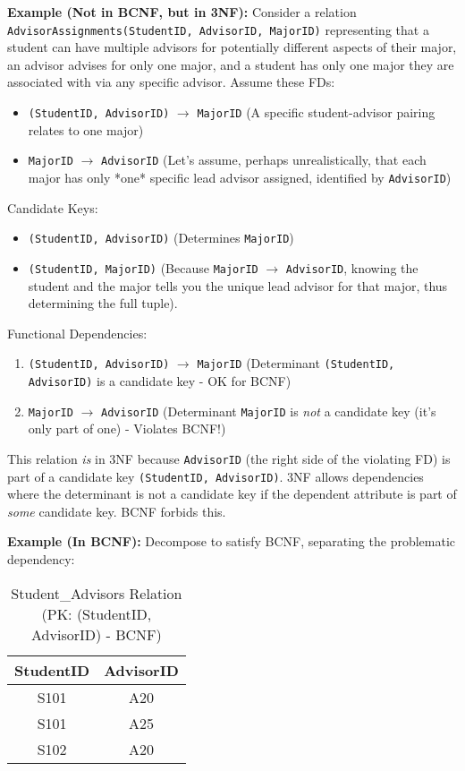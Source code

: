 \documentclass[12pt]{book}
\begin{document}
\textbf{Example (Not in BCNF, but in 3NF):}
Consider a relation \texttt{AdvisorAssignments(StudentID, AdvisorID, MajorID)} representing that a student can have multiple advisors for potentially different aspects of their major, an advisor advises for only one major, and a student has only one major they are associated with via any specific advisor.
Assume these FDs:
\begin{itemize}
    \item \texttt{(StudentID, AdvisorID)} $\rightarrow$ \texttt{MajorID} (A specific student-advisor pairing relates to one major)
    \item \texttt{MajorID} $\rightarrow$ \texttt{AdvisorID} (Let's assume, perhaps unrealistically, that each major has only *one* specific lead advisor assigned, identified by \texttt{AdvisorID})
\end{itemize}
Candidate Keys:
\begin{itemize}
    \item \texttt{(StudentID, AdvisorID)} (Determines \texttt{MajorID})
    \item \texttt{(StudentID, MajorID)} (Because \texttt{MajorID} $\rightarrow$ \texttt{AdvisorID}, knowing the student and the major tells you the unique lead advisor for that major, thus determining the full tuple).
\end{itemize}
Functional Dependencies:
\begin{enumerate}
    \item \texttt{(StudentID, AdvisorID)} $\rightarrow$ \texttt{MajorID} (Determinant \texttt{(StudentID, AdvisorID)} is a candidate key - OK for BCNF)
    \item \texttt{MajorID} $\rightarrow$ \texttt{AdvisorID} (Determinant \texttt{MajorID} is \emph{not} a candidate key (it's only part of one) - Violates BCNF!)
\end{enumerate}

This relation \emph{is} in 3NF because \texttt{AdvisorID} (the right side of the violating FD) is part of a candidate key \texttt{(StudentID, AdvisorID)}. 3NF allows dependencies where the determinant is not a candidate key if the dependent attribute is part of \emph{some} candidate key. BCNF forbids this.

\textbf{Example (In BCNF):}
Decompose to satisfy BCNF, separating the problematic dependency:

\begin{table}[htbp]
\centering
\begin{tabular}{@{}cc@{}}
\toprule
StudentID & AdvisorID \\ %
\midrule
 S101 & A20 \\
 S101 & A25 \\ %
 S102 & A20 \\
\bottomrule
\end{tabular}
\caption{Student\_Advisors Relation (PK: (StudentID, AdvisorID) - BCNF)}
\label{tab:student_advisors_bcnf}
\end{table}
\end{document}
